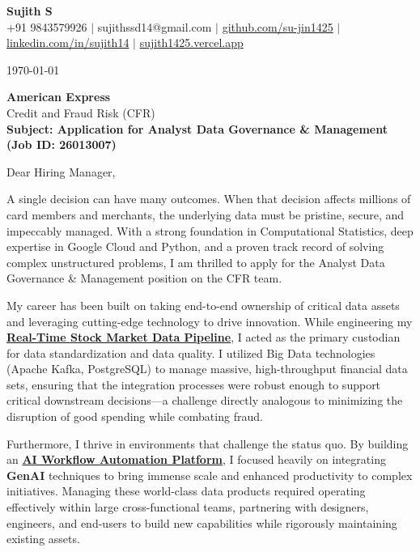 \documentclass[a4paper,11pt]{article}
\newcommand{\ulink}[2]{\href{#1}{#2}}
\begin{document}
\pagestyle{empty}

\begin{center}
{\color[HTML]{000000}\fontsize{30}{35}\selectfont\bfseries Sujith S} \\[5pt]
{\fontsize{10.5}{12.5}\selectfont\textcolor[HTML]{3A3A3A}{+91 9843579926 $|$ sujithssd14@gmail.com $|$ \ulink{https://github.com/su-jin1425}{github.com/su-jin1425} $|$ \ulink{https://linkedin.com/in/sujith14}{linkedin.com/in/sujith14} $|$ \ulink{https://sujith1425.vercel.app}{sujith1425.vercel.app}}}
\end{center}

\vspace{10pt}

\today

\textbf{American Express} \\
Credit and Fraud Risk (CFR) \\

\textbf{Subject: Application for Analyst Data Governance \& Management (Job ID: 26013007)}

Dear Hiring Manager,

A single decision can have many outcomes. When that decision affects millions of card members and merchants, the underlying data must be pristine, secure, and impeccably managed. With a strong foundation in Computational Statistics, deep expertise in Google Cloud and Python, and a proven track record of solving complex unstructured problems, I am thrilled to apply for the Analyst Data Governance \& Management position on the CFR team.

My career has been built on taking end-to-end ownership of critical data assets and leveraging cutting-edge technology to drive innovation. While engineering my \ulink{https://github.com/su-jin1425/Real-Time-Stock-Market-Data-Pipeline}{\textbf{Real-Time Stock Market Data Pipeline}}, I acted as the primary custodian for data standardization and data quality. I utilized Big Data technologies (Apache Kafka, PostgreSQL) to manage massive, high-throughput financial data sets, ensuring that the integration processes were robust enough to support critical downstream decisions---a challenge directly analogous to minimizing the disruption of good spending while combating fraud.

Furthermore, I thrive in environments that challenge the status quo. By building an \ulink{https://github.com/su-jin1425/AI-Workflow-Automation-Platform}{\textbf{AI Workflow Automation Platform}}, I focused heavily on integrating \textbf{GenAI} techniques to bring immense scale and enhanced productivity to complex initiatives. Managing these world-class data products required operating effectively within large cross-functional teams, partnering with designers, engineers, and end-users to build new capabilities while rigorously maintaining existing assets.
\end{document}
